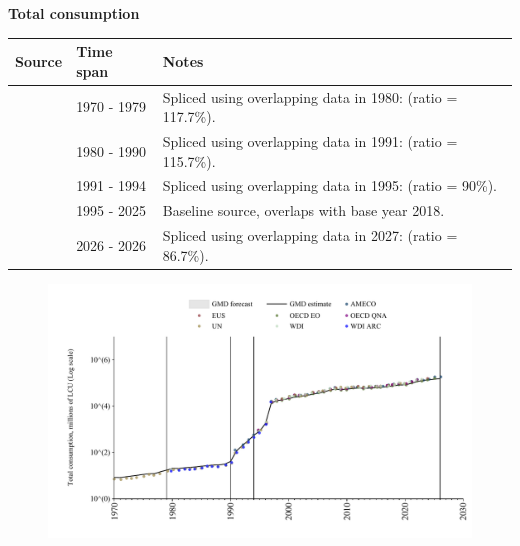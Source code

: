 \documentclass[12pt,a4paper,landscape]{article}
\begin{document}
\begin{adjustbox}{max totalsize={\paperwidth}{\paperheight},center}
\begin{minipage}[t][\textheight][t]{\textwidth}
\vspace*{0.5cm}
{}
\begin{center}
{\Large\bfseries Total consumption}
\end{center}
\vspace{0.5cm}
\begin{table}[H]
\centering
\small
\begin{tabular}{|l|l|l|}
\hline
\textbf{Source} & \textbf{Time span} & \textbf{Notes} \\
\hline
\rowcolor{white}\cite{UN}& 1970 - 1979 &Spliced using overlapping data in 1980: (ratio = 117.7\%). \\
\rowcolor{lightgray}\cite{WDI}& 1980 - 1990 &Spliced using overlapping data in 1991: (ratio = 115.7\%). \\
\rowcolor{white}\cite{AMECO}& 1991 - 1994 &Spliced using overlapping data in 1995: (ratio = 90\%). \\
\rowcolor{lightgray}\cite{OECD_EO}& 1995 - 2025 &Baseline source, overlaps with base year 2018. \\
\rowcolor{white}\cite{AMECO}& 2026 - 2026 &Spliced using overlapping data in 2027: (ratio = 86.7\%). \\
\hline
\end{tabular}
\end{table}
\begin{figure}[H]
\centering
\includegraphics[width=\textwidth,height=0.6\textheight,keepaspectratio]{graphs/BGR_cons.pdf}
\end{figure}
\end{minipage}
\end{adjustbox}
\end{document}
